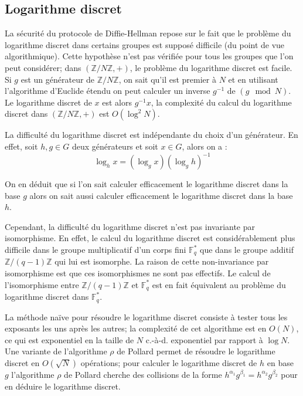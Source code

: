 \documentclass[a4paper]{article}
\theoremstyle{definition}
\theoremstyle{remark}
\numberwithin{equation}{section}
\begin{document}
\subsection{Logarithme discret}
La sécurité du protocole de Diffie-Hellman repose sur le fait que le problème du logarithme discret dans certains groupes est supposé difficile (du point de vue algorithmique). Cette hypothèse n'est pas vérifiée pour tous les groupes que l'on peut considérer; dans $(\mathbb{Z}/N\mathbb{Z},+)$, le problème du logarithme discret est facile. Si $g$ est un générateur de $\mathbb{Z}/N\mathbb{Z}$, on sait qu'il est premier à $N$ et en utilisant l'algorithme d'Euclide étendu on peut calculer un inverse $g^{-1}$ de $(g \mod N)$. Le logarithme discret de $x$ est alors $g^{-1}x$, la complexité du calcul du logarithme discret dans $(\mathbb{Z}/N\mathbb{Z},+)$ est $O(\log^2N)$.

La difficulté du logarithme discret est indépendante du choix d'un générateur. En effet, soit $h,g \in G$ deux générateurs et soit $x \in G$, alors on a :
$$\log_h x = (\log_g x)(\log_g h)^{-1}$$

On en déduit que si l'on sait calculer efficacement le logarithme discret dans la base $g$ alors on sait aussi calculer efficacement le logarithme discret dans la base $h$.

Cependant, la difficulté du logarithme discret n'est pas invariante par isomorphisme. En effet, le calcul du logarithme discret est considérablement plus difficile dans le groupe multiplicatif d'un corps fini $\mathbb{F}^*_q$ que dans le groupe additif $\mathbb{Z}/(q-1)\mathbb{Z}$ qui lui est isomorphe. La raison de cette non-invariance par isomorphisme est que ces isomorphismes ne sont pas effectifs. Le calcul de l'isomorphisme entre $\mathbb{Z}/(q-1)\mathbb{Z}$ et $\mathbb{F}^*_q$ est en fait équivalent au problème du logarithme discret dans $\mathbb{F}_q^*$.

La méthode naïve pour résoudre le logarithme discret consiste à tester tous les exposants les uns après les autres; la complexité de cet algorithme est en $O(N)$, ce qui est exponentiel en la taille de $N$ c.-à-d. exponentiel par rapport à $\log N$. Une variante de l'algorithme $\rho$ de Pollard \cite{pollard} permet de résoudre le logarithme discret en $O(\sqrt{N})$ opérations; pour calculer le logarithme discret de $h$ en base $g$ l'algorithme $\rho$ de Pollard cherche des collisions de la forme $h^{\alpha_1}g^{\beta_1} = h^{\alpha_2}g^{\beta_2}$ pour en déduire le logarithme discret.
\end{document}
